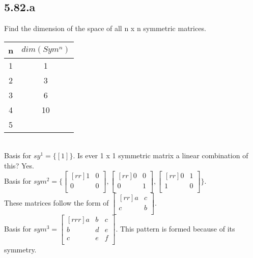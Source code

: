 \documentclass{report}
\begin{document}
\subsection{5.82.a}
Find the dimension of the space of all n x n symmetric matrices.\\
\begin{tabular}{c|c}
n & $dim(Sym^n)$\\
\hline
1 & 1\\
2 & 3\\
3 & 6\\
4 & 10\\
5\\
\end{tabular}\\
Basis for $sy^1=\{[1]\}$. Is ever 1 x 1 symmetric matrix a linear combination of this? Yes.\\
Basis for $sym^2=\{\begin{bmatrix}[rr]1&0\\0&0\\\end{bmatrix},\begin{bmatrix}[rr]0&0\\0&1\\\end{bmatrix},\begin{bmatrix}[rr]0&1\\1&0\\\end{bmatrix}\}$. \\These matrices follow the form of $\begin{bmatrix}[rr]a&c\\c&b\\\end{bmatrix}$.\\
Basis for $sym^3 = \begin{bmatrix}[rrr]a&b&c\\b&d&e\\c&e&f\\\end{bmatrix}$. This pattern is formed because of its symmetry.
\end{document}
